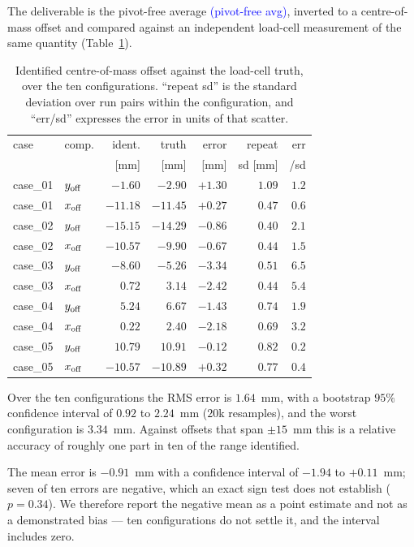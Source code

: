 \documentclass[10pt]{article}
\newcommand{\pl}[1]{\textcolor{blue}{(#1)}}
\begin{document}
The deliverable is the pivot-free average \pl{pivot-free avg},
inverted to a centre-of-mass offset and compared against an
independent load-cell measurement of the same quantity
(Table~\ref{tab:offset}).

\begin{table}[t]
\centering
\caption{Identified centre-of-mass offset against the load-cell truth,
over the ten configurations. ``repeat sd'' is the standard deviation
over run pairs within the configuration, and ``err/sd'' expresses the
error in units of that scatter.}
\label{tab:offset}
\small
\setlength{\tabcolsep}{4pt}
\begin{tabular}{@{}ll rrr rr@{}}
\hline
case & comp. & ident. & truth & error & repeat & err \\
 & & [mm] & [mm] & [mm] & sd [mm] & /sd \\
\hline
case\_01 & $y_{\rm off}$ & $-1.60$  & $-2.90$  & $+1.30$ & $1.09$ & $1.2$\\
case\_01 & $x_{\rm off}$ & $-11.18$ & $-11.45$ & $+0.27$ & $0.47$ & $0.6$\\
case\_02 & $y_{\rm off}$ & $-15.15$ & $-14.29$ & $-0.86$ & $0.40$ & $2.1$\\
case\_02 & $x_{\rm off}$ & $-10.57$ & $-9.90$  & $-0.67$ & $0.44$ & $1.5$\\
case\_03 & $y_{\rm off}$ & $-8.60$  & $-5.26$  & $-3.34$ & $0.51$ & $6.5$\\
case\_03 & $x_{\rm off}$ & $0.72$   & $3.14$   & $-2.42$ & $0.44$ & $5.4$\\
case\_04 & $y_{\rm off}$ & $5.24$   & $6.67$   & $-1.43$ & $0.74$ & $1.9$\\
case\_04 & $x_{\rm off}$ & $0.22$   & $2.40$   & $-2.18$ & $0.69$ & $3.2$\\
case\_05 & $y_{\rm off}$ & $10.79$  & $10.91$  & $-0.12$ & $0.82$ & $0.2$\\
case\_05 & $x_{\rm off}$ & $-10.57$ & $-10.89$ & $+0.32$ & $0.77$ & $0.4$\\
\hline
\end{tabular}
\end{table}

Over the ten configurations the RMS error is $1.64$~mm, with a
bootstrap $95\%$ confidence interval of $0.92$ to $2.24$~mm ($20$k
resamples), and the worst configuration is $3.34$~mm. Against offsets
that span $\pm15$~mm this is a relative accuracy of roughly one part
in ten of the range identified.

The mean error is $-0.91$~mm with a confidence interval of $-1.94$ to
$+0.11$~mm; seven of ten errors are negative, which an exact sign test
does not establish ($p = 0.34$). We therefore report the negative mean
as a point estimate and not as a demonstrated bias --- ten
configurations do not settle it, and the interval includes zero.
\end{document}
